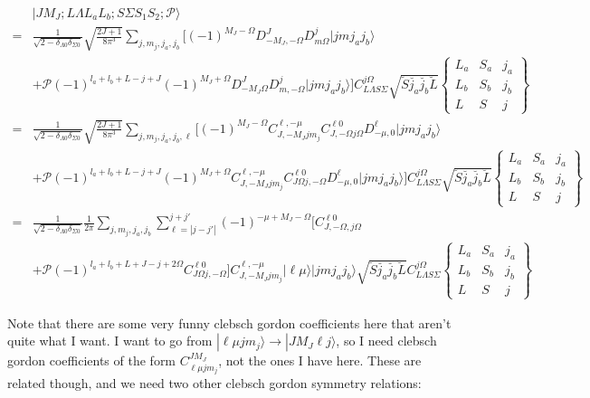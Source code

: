 \documentclass[prl, longbibliography]{revtex4-2}
\begin{document}
\begin{equation}
\begin{split}
&|J M_J; L \Lambda L_a L_b; S \Sigma  S_1 S_2; \mathcal{P} \rangle
\\
=&\frac{1}{\sqrt{2-\delta_{\Lambda 0}\delta_{\Sigma 0}}}
\sqrt{\frac{2J+1}{8\pi^3}}
\sum_{j, m_j, j_a, j_b} \bigg[
(-1)^{M_J-\Omega} D_{-M_J,-\Omega}^J
D^j_{m \Omega}
|j m j_a j_b\rangle
\\
&+
\mathcal{P}(-1)^{l_a+l_b+L-j+J}
(-1)^{M_J+\Omega} D_{-M_J\Omega}^J
D^j_{m,-\Omega}|j m j_a j_b\rangle \bigg]
C_{L\Lambda S\Sigma}^{j\Omega}\sqrt{\breve{S}\breve{j_a}\breve{j_b}\breve{L}}
\begin{Bmatrix}
L_a & S_a & j_a\\
L_b & S_b & j_b\\
L & S & j
\end{Bmatrix}
\\
=&\frac{1}{\sqrt{2-\delta_{\Lambda 0}\delta_{\Sigma 0}}}
\sqrt{\frac{2J+1}{8\pi^3}}
\sum_{j, m_j, j_a, j_b,\ell} \bigg[
(-1)^{M_J-\Omega} 
C_{J,-M_J j m_j}^{\ell, -\mu}
C_{J,-\Omega j \Omega}^{\ell 0}
D^{\ell}_{-\mu,0}
|j m j_a j_b\rangle
\\
&+
\mathcal{P}(-1)^{l_a+l_b+L-j+J}
(-1)^{M_J+\Omega} 
C_{J,-M_J j m_j}^{\ell, -\mu}
C_{J\Omega j,-\Omega}^{\ell 0}
D^{\ell}_{-\mu,0}
|j m j_a j_b\rangle \bigg]
C_{L\Lambda S\Sigma}^{j\Omega}\sqrt{\breve{S}\breve{j_a}\breve{j_b}\breve{L}}
\begin{Bmatrix}
L_a & S_a & j_a\\
L_b & S_b & j_b\\
L & S & j
\end{Bmatrix}
\\
=&\frac{1}{\sqrt{2-\delta_{\Lambda 0}\delta_{\Sigma 0}}}
\frac{1}{2\pi}
\sum_{j, m_j, j_a, j_b} 
\sum_{\ell=|j-j'|}^{j+j'} 
(-1)^{-\mu+M_J-\Omega}
\bigg[
C_{J,-\Omega, j \Omega}^{\ell 0}
\\
&+\mathcal{P}(-1)^{l_a+l_b+L+J-j+2\Omega}
C_{J\Omega j,-\Omega}^{\ell 0}
\bigg]
C_{J,-M_J j m_j}^{\ell, -\mu}|\ell\mu\rangle |j m j_a j_b\rangle
\sqrt{\breve{S}\breve{j_a}\breve{j_b}\breve{L}} 
C_{L \Lambda S \Sigma}^{j \Omega}
\begin{Bmatrix}
L_a & S_a & j_a\\
L_b & S_b & j_b\\
L & S & j
\end{Bmatrix}
\end{split}
\end{equation}

Note that there are some very funny clebsch gordon coefficients here that aren't quite what I want. I want to go from $|\ell\mu jm_j\rangle\rightarrow|J M_J \ell j\rangle$, so I need clebsch gordon coefficients of the form $C_{\ell \mu j m_j}^{J M_J}$, not the ones I have here. These are related though, and we need two other clebsch gordon symmetry relations:
\end{document}
